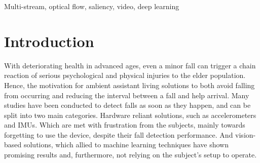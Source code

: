 \documentclass[conference]{IEEEtran}
\begin{document}
\begin{IEEEkeywords}
Multi-stream, optical flow, saliency, video, deep learning
\end{IEEEkeywords}

\section{Introduction}

With deteriorating health in advanced ages, even a minor fall can trigger a chain reaction of serious psychological and physical injuries to the elder population. Hence, the motivation for ambient assistant living solutions to both avoid falling from occurring and reducing the interval between a fall and help arrival. Many studies have been conducted to detect falls as soon as they happen, and can be split into two main categories. Hardware reliant solutions, such as accelerometers and IMUs. Which are met with frustration from the subjects, mainly towards forgetting to use the device, despite their fall detection performance. And vision-based solutions, which allied to machine learning techniques have shown promising results and, furthermore, not relying on the subject's setup to operate.
\end{document}
